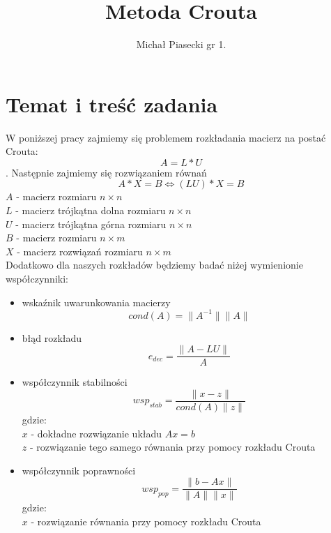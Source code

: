 \documentclass{article}\usepackage{amsmath,amsfonts,amssymb}
\title{Metoda Crouta \\}
\author{Michał Piasecki gr 1. }
\begin{document}
\maketitle

\section{Temat i treść zadania}
W poniższej pracy zajmiemy się problemem rozkładania macierz na postać Crouta: \[ A = L * U   \]. Następnie zajmiemy się rozwiązaniem równań \[  A*X = B     \Leftrightarrow     (LU)*X = B   \]
\boldmath
$A$ - macierz rozmiaru $n \times n $  \\
$L$ - macierz trójkątna dolna rozmiaru $n \times n $  \\
$U$ - macierz trójkątna górna rozmiaru $n \times n$ \\
$B$ - macierz  rozmiaru $n \times m$ \\
$X$ - macierz rozwiązań rozmiaru $n \times m$ \\
\unboldmath
Dodatkowo dla naszych rozkładów będziemy badać niżej wymienionie współczynniki: \\
\begin{itemize}
    \item wskaźnik uwarunkowania macierzy \[ cond(A) =  \|A^{-1} \| \| A \| \]
    \item błąd rozkładu \[ e_{dec} = \frac{\| A - LU \|}{A} \]
    \item współczynnik stabilności \[ wsp_{stab} = \frac{\| x - z \|}{cond(A) \|z\|} \]
    gdzie: \\
    $x$ - dokładne rozwiązanie układu $Ax = b$ \\
    $z$ - rozwiązanie tego samego równania przy pomocy rozkładu Crouta \\
    \item współczynnik poprawności \[ wsp_{pop} = \frac{\| b - Ax \|}{\|A\| \|x\|} \]
    gdzie: \\
    $x$ - rozwiązanie równania przy pomocy rozkładu Crouta
    
    
    
    
\end{itemize}
\\


\newpage
\end{document}
